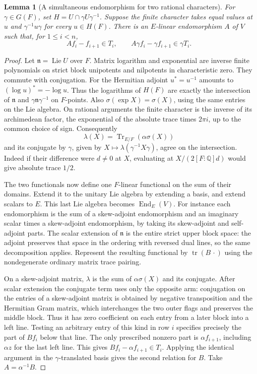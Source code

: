 \documentclass[a4paper,11pt]{article}
\newtheorem{lemma}[proposition]{Lemma}
\theoremstyle{definition}
\theoremstyle{remark}
\numberwithin{equation}{section}
\begin{document}
\begin{lemma}[A simultaneous endomorphism for two rational characters]
\leavevmode\label{lem:rationalshift680}
For \(\gamma\in G(F)\), set \(H=U\cap\gamma U\gamma^{-1}\).
Suppose the finite character takes equal values at \(u\) and
\(\gamma^{-1}u\gamma\) for every \(u\in H(F)\). There is an
\(E\)-linear endomorphism \(A\) of \(V\) such that, for \(1\le i<n\),
\[
 A f_i-f_{i+1}\in T_i,\qquad
 A\gamma f_i-\gamma f_{i+1}\in\gamma T_i .
\]
\end{lemma}
\begin{proof}
Let \(\mathfrak n=\operatorname{Lie}U\) over \(F\). Matrix logarithm
and exponential are inverse finite polynomials on strict block
unipotents and nilpotents in characteristic zero. They commute
with conjugation. For the Hermitian adjoint \(u^*=u^{-1}\) amounts
to \((\log u)^*=-\log u\). Thus the logarithms of \(H(F)\) are
exactly the intersection of \(\mathfrak n\) and
\(\gamma\mathfrak n\gamma^{-1}\) on \(F\)-points. Also
\(\sigma(\exp X)=\sigma(X)\), using the same entries on the Lie
algebra. On rational arguments the finite character is the inverse
of its archimedean factor, the exponential of the absolute trace
times \(2\pi i\), up to the common choice of sign. Consequently
\[
 \lambda(X)=\operatorname{Tr}_{E/F}(\alpha\sigma(X))
\]
and its conjugate by \(\gamma\), given by
\(X\mapsto\lambda(\gamma^{-1}X\gamma)\), agree on the intersection.
Indeed if their difference were \(d\ne0\) at \(X\), evaluating at
\(X/(2[F:\mathbb Q]d)\) would give absolute trace \(1/2\).

The two functionals now define one \(F\)-linear functional on the
sum of their domains. Extend it to the unitary Lie algebra by
extending a basis, and extend scalars to \(E\). This last Lie
algebra becomes \(\operatorname{End}_E(V)\). For instance each
endomorphism is the sum of a skew-adjoint endomorphism and an
imaginary scalar times a skew-adjoint endomorphism, by taking its
skew-adjoint and self-adjoint parts. The scalar extension of
\(\mathfrak n\) is the entire strict upper block space: the
adjoint preserves that space in the ordering with reversed dual
lines, so the same decomposition applies. Represent the resulting
functional by \(\operatorname{tr}(B\,\cdot)\) using the
nondegenerate ordinary matrix trace pairing.

On a skew-adjoint matrix, \(\lambda\) is the sum of
\(\alpha\sigma(X)\) and its conjugate. After scalar extension the
conjugate term uses only the opposite arm: conjugation on the
entries of a skew-adjoint matrix is obtained by negative
transposition and the Hermitian Gram matrix, which interchanges
the two outer flags and preserves the middle block. Thus it has
zero coefficient on each entry from a later block into a left
line. Testing an arbitrary entry of this kind in row \(i\)
specifies precisely the part of \(Bf_i\) below that line.
The only prescribed nonzero part is \(\alpha f_{i+1}\), including
\(\alpha z\) for the last left line. This gives
\(Bf_i-\alpha f_{i+1}\in T_i\). Applying the identical argument
in the \(\gamma\)-translated basis gives the second relation for
\(B\). Take \(A=\alpha^{-1}B\).
\end{proof}
\end{document}

